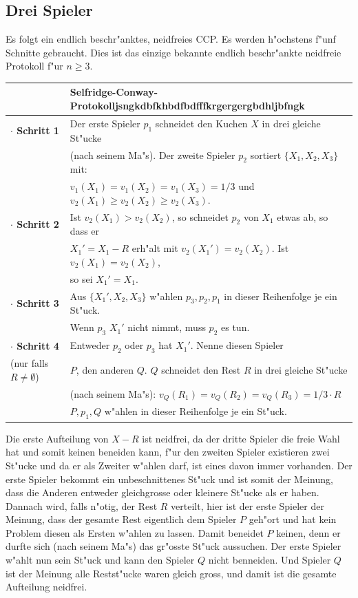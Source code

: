 \documentclass[11pt, a4paper, twoside]{article}
\newcommand{\wf}{\color{white}}
\newcommand{\tf}{\color{black}}
\numberwithin{equation}{section}
\begin{document}
\subsection{Drei Spieler}
Es folgt ein endlich beschr"anktes, neidfreies CCP. Es werden h"ochstens f"unf Schnitte gebraucht. Dies ist das einzige bekannte endlich beschr"ankte neidfreie Protokoll f"ur $n \geq 3$.\\
\newline
\begin{tabular}{|ll|}
\hline
&\textbf{Selfridge-Conway-Protokoll}\wf jsngkdbfkhbdfbdfffkrgergergbdhljbfngk\tf\\
\hline
\textbf{$\cdot$ Schritt 1}&Der erste Spieler $p_1$ schneidet den Kuchen $X$ in drei gleiche St"ucke\\&(nach seinem Ma"s). Der zweite Spieler $p_2$ sortiert $\{X_1,X_2,X_3\}$ mit:\\
& $v_1(X_1)=v_1(X_2)=v_1(X_3)=1/3$ und $v_2(X_1) \geq v_2(X_2) \geq v_2(X_3)$.\\
\textbf{$\cdot$ Schritt 2}& Ist $v_2(X_1)>v_2(X_2)$, so schneidet $p_2$ von $X_1$ etwas ab, so dass er\\&$X_1'=X_1-R$ erh"alt mit   $v_2(X_1')=v_2(X_2)$. Ist $v_2(X_1)=v_2(X_2)$,\\&so sei $X_1'=X_1$.\\
\textbf{$\cdot$ Schritt 3}&Aus $\{X_1',X_2,X_3\}$ w"ahlen $p_3,p_2,p_1$ in dieser Reihenfolge je ein St"uck.\\&Wenn $p_3$ $X_1'$ nicht nimmt, muss $p_2$ es tun.\\
\textbf{$\cdot$ Schritt 4}& Entweder $p_2$ oder $p_3$ hat $X_1'$. Nenne diesen Spieler\\(nur falls $R \neq \emptyset$)&$P$, den anderen $Q$. $Q$ schneidet den Rest $R$ in drei gleiche St"ucke\\&(nach seinem Ma"s): $v_Q(R_1)=v_Q(R_2)=v_Q(R_3)=1/3 \cdot R$\\& $P,p_1,Q$ w"ahlen in dieser Reihenfolge je ein St"uck.\\
\hline
\end{tabular}
\newline
\newline
\newline
 Die erste Aufteilung von $X-R$ ist neidfrei, da der dritte Spieler die freie Wahl hat und somit keinen beneiden kann, f"ur den zweiten Spieler existieren zwei St"ucke und da er als Zweiter w"ahlen darf, ist eines davon immer vorhanden. Der erste Spieler bekommt ein unbeschnittenes St"uck und ist somit der Meinung, dass die Anderen entweder gleichgrosse oder kleinere St"ucke als er haben. Dannach wird, falls n"otig, der Rest $R$ verteilt, hier ist der erste Spieler der Meinung, dass der gesamte Rest eigentlich dem Spieler $P$ geh"ort und hat kein Problem diesen als Ersten w"ahlen zu lassen. Damit beneidet $P$ keinen, denn er durfte sich (nach seinem Ma"s) das gr"osste St"uck aussuchen. Der erste Spieler w"ahlt nun  sein St"uck und kann den Spieler $Q$ nicht benneiden. Und Spieler $Q$ ist der Meinung alle Restst"ucke waren gleich gross, und damit ist die gesamte Aufteilung neidfrei.\\
\end{document}
